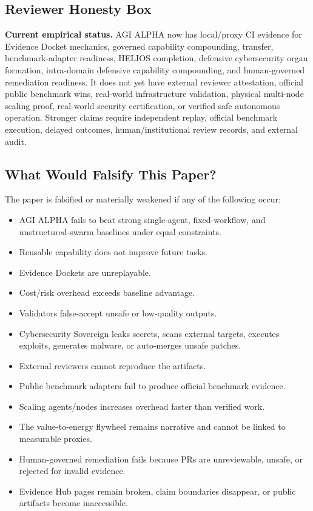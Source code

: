 \subsection{Reviewer Honesty Box}\label{reviewer-honesty-box}

\textbf{Current empirical status.} AGI ALPHA now has local/proxy CI
evidence for Evidence Docket mechanics, governed capability compounding,
transfer, benchmark-adapter readiness, HELIOS completion, defensive
cybersecurity organ formation, intra-domain defensive capability
compounding, and human-governed remediation readiness. It does not yet
have external reviewer attestation, official public benchmark wins,
real-world infrastructure validation, physical multi-node scaling proof,
real-world security certification, or verified safe autonomous
operation. Stronger claims require independent replay, official
benchmark execution, delayed outcomes, human/institutional review
records, and external audit.

\subsection{What Would Falsify This
Paper?}\label{what-would-falsify-this-paper}

The paper is falsified or materially weakened if any of the following
occur:

\begin{itemize}
\tightlist
\item
  AGI ALPHA fails to beat strong single-agent, fixed-workflow, and
  unstructured-swarm baselines under equal constraints.
\item
  Reusable capability does not improve future tasks.
\item
  Evidence Dockets are unreplayable.
\item
  Cost/risk overhead exceeds baseline advantage.
\item
  Validators false-accept unsafe or low-quality outputs.
\item
  Cybersecurity Sovereign leaks secrets, scans external targets,
  executes exploits, generates malware, or auto-merges unsafe patches.
\item
  External reviewers cannot reproduce the artifacts.
\item
  Public benchmark adapters fail to produce official benchmark evidence.
\item
  Scaling agents/nodes increases overhead faster than verified work.
\item
  The value-to-energy flywheel remains narrative and cannot be linked to
  measurable proxies.
\item
  Human-governed remediation fails because PRs are unreviewable, unsafe,
  or rejected for invalid evidence.
\item
  Evidence Hub pages remain broken, claim boundaries disappear, or
  public artifacts become inaccessible.
\end{itemize}

